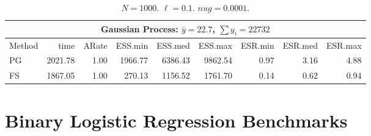 \documentclass{article}
\begin{document}
\begin{table}
\label{tab:nb-gp-ex02}
\begin{tabular}{l r r r r r r r r } 
\hline
\multicolumn{9}{c}{Gaussian Process: $\bar y = 22.7$, $\sum y_i = 22732$} \\
\hline
Method  &     time &    ARate &  ESS.min &  ESS.med &  ESS.max &  ESR.min &  ESR.med &  ESR.max \\ 
    PG  &  2021.78 &     1.00 &  1966.77 &  6386.43 &  9862.54 &     0.97 &     3.16 &     4.88 \\ 
    FS  &  1867.05 &     1.00 &   270.13 &  1156.52 &  1761.70 &     0.14 &     0.62 &     0.94
 \end{tabular}
\caption{$N = 1000$.  $\ell=0.1$.  $nug=0.0001$.}
\end{table}

\appendix

\section{Binary Logistic Regression Benchmarks}
\label{sec:blogit-benchmarks}

% 



{}
\end{document}
